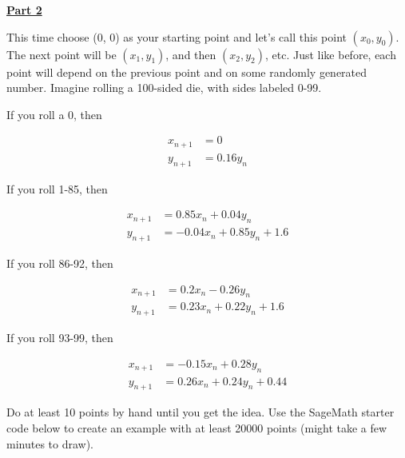 
\underline{\textbf{Part 2}} \par

This time choose (0, 0) as your starting point and let's call this point $(x_0, y_0)$.
The next point will be $(x_1, y_1)$, and then $(x_2, y_2)$, etc.
Just like before, each point will depend on the previous point and on some randomly generated number.
Imagine rolling a 100-sided die, with sides labeled 0-99.

\vspace{\baselineskip}

If you roll a 0, then

\begin{align}
x_{n+1} &= 0 \\
y_{n+1} &= 0.16 y_n
\end{align}

\vspace{\baselineskip}

If you roll 1-85, then

\begin{align}
x_{n+1} &= 0.85 x_n + 0.04 y_n \\
y_{n+1} &= -0.04 x_n + 0.85 y_n + 1.6
\end{align}

\vspace{\baselineskip}

If you roll 86-92, then

\begin{align}
x_{n+1} &= 0.2 x_n - 0.26 y_n \\
y_{n+1} &= 0.23 x_n + 0.22 y_n + 1.6
\end{align}

\vspace{\baselineskip}

If you roll 93-99, then

\begin{align}
x_{n+1} &= -0.15 x_n + 0.28 y_n \\
y_{n+1} &= 0.26 x_n + 0.24 y_n + 0.44
\end{align}

\vspace{\baselineskip}

Do at least 10 points by hand until you get the idea.
Use the SageMath starter code below to create an example with at least 20000 points (might take a few minutes to draw).

